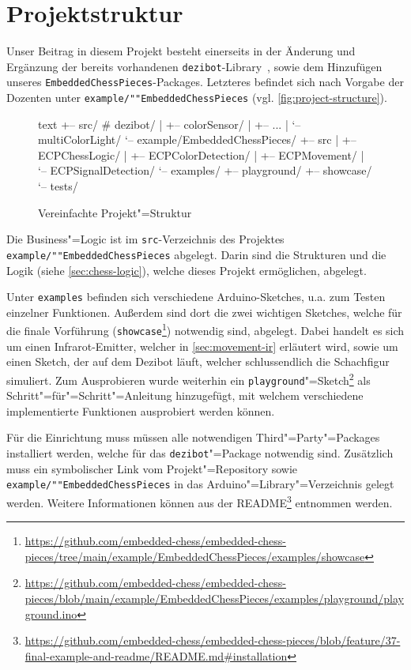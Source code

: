 
\section{Projektstruktur}
\label{sec:final-project-structure}

Unser Beitrag in diesem Projekt besteht einerseits in der Änderung und Ergänzung der bereits vorhandenen \texttt{dezibot}-Library~\cite{dezibotteamDezibotDezibot2025}, sowie dem Hinzufügen unseres \texttt{Embedded\-Chess\-Pieces}-Packages. Letzteres befindet sich nach Vorgabe der Dozenten unter \texttt{example/""Embedded\-Chess\-Pieces} (vgl. \autoref{fig:project-structure}).

\begin{figure}[h]
\centering
\begin{cminted}{text}
+-- src/              # dezibot/
|   +-- colorSensor/
|   +-- ...
|   `-- multiColorLight/
`-- example/EmbeddedChessPieces/
    +-- src
    |   +-- ECPChessLogic/
    |   +-- ECPColorDetection/
    |   +-- ECPMovement/
    |   `-- ECPSignalDetection/
    `-- examples/
        +-- playground/
        +-- showcase/
        `-- tests/
\end{cminted}
\caption{Vereinfachte Projekt"=Struktur}
\label{fig:project-structure}
\end{figure}

Die Business"=Logic ist im \texttt{src}-Verzeichnis des Projektes \texttt{example/""Embedded\-Chess\-Pieces} abgelegt. Darin sind die Strukturen und die Logik (siehe \autoref{sec:chess-logic}), welche dieses Projekt ermöglichen, abgelegt.

Unter \texttt{examples} befinden sich verschiedene Arduino-Sketches, u.a. zum Testen einzelner Funktionen. Außerdem sind dort die zwei wichtigen Sketches, welche für die finale Vorführung (\texttt{showcase}\footnote{\url{https://github.com/embedded-chess/embedded-chess-pieces/tree/main/example/EmbeddedChessPieces/examples/showcase}}) notwendig sind, abgelegt. Dabei handelt es sich um einen Infrarot-Emitter, welcher in \autoref{sec:movement-ir} erläutert wird, sowie um einen Sketch, der auf dem Dezibot läuft, welcher schlussendlich die Schachfigur simuliert. Zum Ausprobieren wurde weiterhin ein \texttt{playground}"=Sketch\footnote{\url{https://github.com/embedded-chess/embedded-chess-pieces/blob/main/example/EmbeddedChessPieces/examples/playground/playground.ino}} als Schritt"=für"=Schritt"=Anleitung hinzugefügt, mit welchem verschiedene implementierte Funktionen ausprobiert werden können.

Für die Einrichtung muss müssen alle notwendigen Third"=Party"=Packages installiert werden, welche für das \texttt{dezibot}"=Package notwendig sind. Zusätzlich muss ein symbolischer Link vom Projekt"=Repository sowie \texttt{example/""Embedded\-Chess\-Pieces} in das Arduino"=Library"=Verzeichnis gelegt werden. Weitere Informationen können aus der README\footnote{\url{https://github.com/embedded-chess/embedded-chess-pieces/blob/feature/37-final-example-and-readme/README.md\#installation}} entnommen werden.
